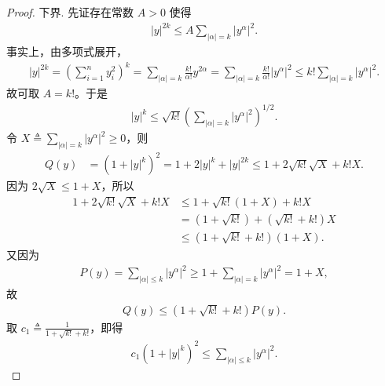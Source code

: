 \documentclass[../../main.tex]{subfiles}
\begin{document}
\begin{proof}
{\heiti 下界. } 先证存在常数 $A>0$ 使得
\begin{align}\label{eq:齐次控制}
|y|^{2k}\leqslant A\sum_{|\alpha|=k}|y^\alpha|^2.
\end{align}
事实上，由多项式展开，
\begin{align*}
|y|^{2k}=\left(\sum_{i=1}^n y_i^2\right)^k
=\sum_{|\alpha|=k}\frac{k!}{\alpha!}y^{2\alpha}
=\sum_{|\alpha|=k}\frac{k!}{\alpha!}|y^\alpha|^2
\leqslant k!\sum_{|\alpha|=k}|y^\alpha|^2.
\end{align*}
故可取 $A=k!$。于是
\begin{align*}
|y|^k\leqslant \sqrt{k!}\left(\sum_{|\alpha|=k}|y^\alpha|^2\right)^{1/2}.
\end{align*}
令 $X\triangleq\sum_{|\alpha|=k}|y^\alpha|^2\geqslant 0$，则
\begin{align*}
Q(y)&=(1+|y|^k)^2
=1+2|y|^k+|y|^{2k}
\leqslant 1+2\sqrt{k!}\sqrt{X}+k!X.
\end{align*}
因为 $2\sqrt{X}\leqslant 1+X$，所以
\begin{align*}
1+2\sqrt{k!}\sqrt{X}+k!X
&\leqslant 1+\sqrt{k!}(1+X)+k!X\\
&=(1+\sqrt{k!})+( \sqrt{k!}+k!)X\\
&\leqslant (1+\sqrt{k!}+k!)(1+X).
\end{align*}
又因为
\begin{align*}
P(y)=\sum_{|\alpha|\leqslant k}|y^\alpha|^2
\geqslant 1+\sum_{|\alpha|=k}|y^\alpha|^2=1+X,
\end{align*}
故
\begin{align*}
Q(y)\leqslant (1+\sqrt{k!}+k!)P(y).
\end{align*}
取 $c_1\triangleq \frac{1}{1+\sqrt{k!}+k!}$，即得
\begin{align*}
c_1(1+|y|^k)^2\leqslant \sum_{|\alpha|\leqslant k}|y^\alpha|^2.
\end{align*}
\end{proof}
\end{document}
